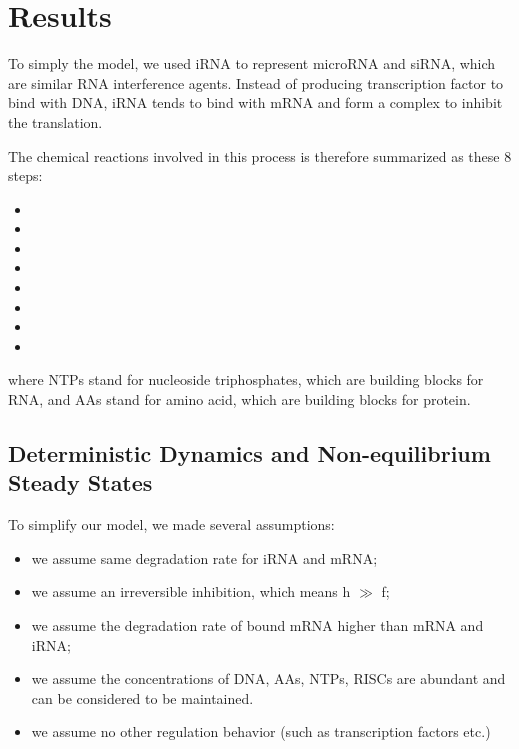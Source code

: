 \documentclass[fleqn,10pt]{wlscirep}
\begin{document}
\section*{Results}

To simply the model, we used iRNA to represent microRNA and siRNA, which are similar RNA interference agents. Instead of producing transcription factor to bind with DNA, iRNA tends to bind with mRNA and form a complex to inhibit the translation. 

The chemical reactions involved in this process is therefore summarized as these 8 steps:

\begin{itemize}
\item {}
\item {}
\item {}
\item {}
\item {}
\item {}
\item {}
\item {}
\end{itemize}
 
where NTPs stand for nucleoside triphosphates, which are building blocks for RNA, and AAs stand for amino acid, which are building blocks for protein.
 
\subsection*{Deterministic Dynamics and Non-equilibrium Steady States}

To simplify our model, we made several assumptions: 
\begin{itemize}
\item we assume same degradation rate for iRNA and mRNA;
\item we assume an irreversible inhibition, which means h $\gg$ f;
\item we assume the degradation rate of bound mRNA higher than mRNA and iRNA;
\item we assume the concentrations of DNA, AAs, NTPs, RISCs are abundant and can be considered to be maintained.
\item we assume no other regulation behavior (such as transcription factors etc.)
\end{itemize}
\end{document}
